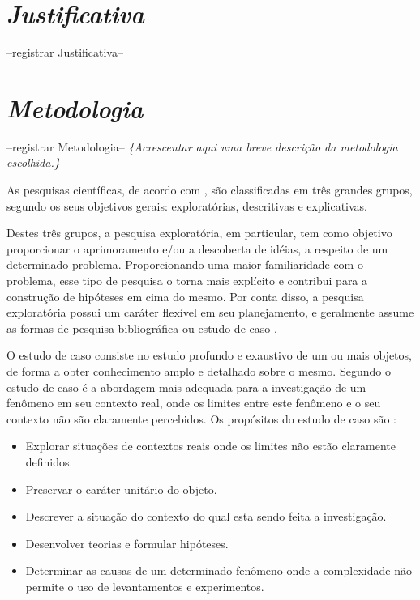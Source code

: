 \section{\textit{Justificativa}}

--registrar Justificativa--

\section{\textit{Metodologia}}

--registrar Metodologia--
\textit{\{Acrescentar aqui uma breve descrição da metodologia escolhida.\}}

As pesquisas científicas, de acordo com , são classificadas em três grandes grupos, segundo os seus objetivos gerais: exploratórias, descritivas e explicativas.

Destes três grupos, a pesquisa exploratória, em particular, tem como objetivo proporcionar o aprimoramento e/ou a descoberta de idéias, a respeito de um determinado problema. Proporcionando uma maior familiaridade com o problema, esse tipo de pesquisa o torna mais explícito e contribui para a construção de hipóteses em cima do mesmo. Por conta disso, a pesquisa exploratória possui um caráter flexível em seu planejamento, e geralmente assume as formas de pesquisa bibliográfica ou estudo de caso \cite{gil2002}.

O estudo de caso consiste no estudo profundo e exaustivo de um ou mais objetos, de forma a obter conhecimento amplo e detalhado sobre o mesmo. Segundo  o estudo de caso é a abordagem mais adequada para a investigação de um fenômeno em seu contexto real, onde os limites entre este fenômeno e o seu contexto não são claramente percebidos. Os propósitos do estudo de caso são \cite{gil2002}:

\begin{itemize}
	\item Explorar situações de contextos reais onde os limites não estão claramente definidos.
	\item Preservar o caráter unitário do objeto.
	\item Descrever a situação do contexto do qual esta sendo feita a investigação.
	\item Desenvolver teorias e formular hipóteses.
	\item Determinar as causas de um determinado fenômeno onde a complexidade não permite o uso de levantamentos e experimentos.
\end{itemize}

